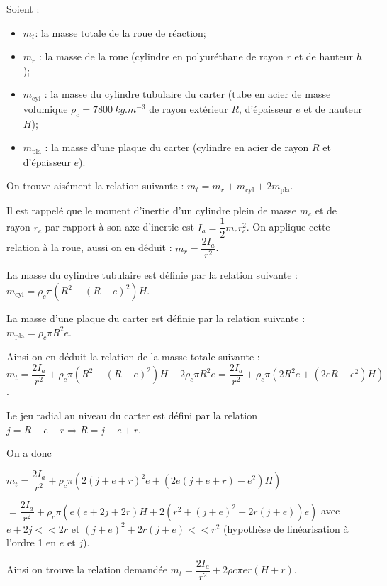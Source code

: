 \ifprof
\begin{corrige}
Soient :
\begin{itemize}
\item $m_t$: la masse totale de la roue de réaction;
\item $m_r$ : la masse de la roue (cylindre en polyuréthane de rayon $r$ et de hauteur $h$);
\item $m_{\text{cyl}}$ : la masse du cylindre tubulaire du carter (tube en acier de masse volumique 
$\rho_c = \SI{7800}{kg.m^{-3}}$ de rayon extérieur $R$, d’épaisseur $e$ et de hauteur $H$);
\item $m_{\text{pla}}$ : la masse d’une plaque du carter (cylindre en acier de rayon $R$ et d’épaisseur $e$).
\end{itemize}
On trouve aisément la relation suivante : $m_t = m_r + m_{\text{cyl}}+2m_{\text{pla}}$.

Il est rappelé que le moment d’inertie d’un cylindre plein de masse $m_c$ et de rayon $r_c$ par
rapport à son axe d’inertie est $I_a = \dfrac{1}{2} m_c r_c^2$. On applique cette relation à la roue, aussi on en
déduit : $m_r = \dfrac{2I_a}{r^2}$.

La masse du cylindre tubulaire est définie par la relation suivante : $m_{\text{cyl}} = \rho_c \pi \left( R^2 - \left(R-e\right)^2\right)H$. 

La masse d’une plaque du carter est définie par la relation suivante : $m_{\text{pla}} = \rho_c \pi R^2 e$.

Ainsi on en déduit la relation de la masse totale suivante : $m_t = \dfrac{2I_a}{r^2} + \rho_c \pi \left( R^2 - \left(R-e\right)^2\right)H +2 \rho_c \pi R^2 e = \dfrac{2I_a}{r^2} + \rho_c \pi \left( 2R^2 e + \left(2eR-e^2\right)H\right)$.


Le jeu radial au niveau du carter est défini par la relation $j=R-e-r \Rightarrow  R = j+e+r$.

On a donc 

$m_t  = \dfrac{2I_a}{r^2} + \rho_c \pi \left( 2\left( j+e+r\right)^2 e + \left(2e\left( j+e+r\right)-e^2\right)H\right)$ 

$ = \dfrac{2I_a}{r^2} + \rho_c \pi \left(e\left(e+2j+2r \right)H + 2\left(r^2 + \left( j+e\right)^2 +2r \left( j+e\right)\right) e\right)$ avec $e+2j <<2r$ et $\left(j+e\right)^2+2r\left(j+e\right)<< r^2$ (hypothèse de linéarisation à l’ordre 1 en $e$ et $j$).

Ainsi on trouve la relation demandée $m_t =  \dfrac{2I_a}{r^2}+2\rho c \pi e r \left(H+r\right)$.

\end{corrige}


